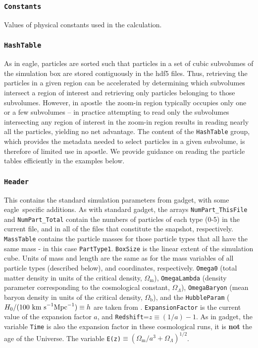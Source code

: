 \documentclass[10pt, a4paper]{article}
\newcommand{\eagle}{{\sc eagle}}
\newcommand{\apostle}{{\sc apostle}}
\newcommand{\gadget}{{\sc gadget}}
\begin{document}
\subsubsection{\texttt{Constants}} Values of physical constants used in the
calculation.

\subsubsection{\texttt{HashTable}}
\label{SecHashTable}
As in \eagle, particles are sorted such that particles in a set of cubic subvolumes
of the simulation box are stored contiguously in the hdf5 files. Thus, retrieving
the particles in a given region can be accelerated by determining which subvolumes
intersect a region of interest and retrieving only particles belonging to those
subvolumes. However, in \apostle\ the zoom-in region typically occupies only one
or a few subvolumes -- in practice attempting to read only the subvolumes intersecting
any region of interest in the zoom-in region results in reading nearly all
the particles, yielding no net advantage. The content of the \texttt{HashTable} group,
which provides the metadata needed to select particles in a given subvolume,
is therefore of limited use in \apostle. We provide guidance on reading the particle
tables efficiently in the examples below.

\subsubsection{\texttt{Header}}
\label{SecHeader}
This contains the standard simulation parameters from \gadget, with some
\eagle\ specific additions. As with standard \gadget, the arrays
\texttt{NumPart\_ThisFile} and \texttt{NumPart\_Total} contain the numbers of
particles of each type (0-5) in the current file, and in all of the files that
constitute the snapshot, respectively. \texttt{MassTable} contains the particle
masses for those particle types that all have the same mass - in this case
\texttt{PartType1}. \texttt{BoxSize} is the linear extent of the simulation
cube. Units of mass and length are the same as for the mass variables of all
particle types (described below), and coordinates, respectively.
\texttt{Omega0} (total matter density in units of the critical density,
$\Omega_{\mathrm{m}}$), \texttt{OmegaLambda} (density parameter corresponding
to the cosmological constant, $\Omega_\Lambda$), \texttt{OmegaBaryon} (mean
baryon density in units of the critical density, $\Omega_{\mathrm{b}}$), and
the \texttt{HubbleParam} ($H_0/(100~{\rm km~s}^{-1}{\rm Mpc}^{-1})\equiv h$ are
taken from \cite{2011ApJS..192...18K}. \texttt{ExpansionFactor} is the current value of
the expansion factor $a$, and \texttt{Redshift}=$z\equiv (1/a) - 1$. As in
\gadget, the variable \texttt{Time} is also the expansion factor in these
cosmological runs, it is {\bf not} the age of the Universe. The variable
\texttt{E(z)}$\equiv (\Omega_{\mathrm{m}}/a^3+\Omega_\Lambda)^{1/2}$.
\end{document}
